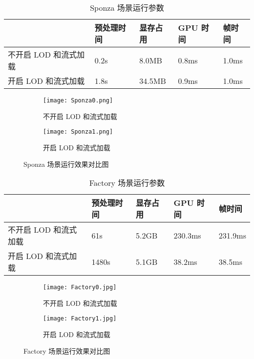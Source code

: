 \begin{table}[H]
    \caption{\label{tab:Sponza data}Sponza 场景运行参数}
    \begin{tabularx}{\linewidth}{|X<{\centering}|X<{\centering}|X<{\centering}|X<{\centering}|X<{\centering}|}
        \hline
        ~ & 预处理时间 & 显存占用 & GPU 时间 & 帧时间 \\ \hline
        不开启 LOD 和流式加载 & 0.2s & 8.0MB & 0.8ms & 1.0ms \\ \hline
        开启 LOD 和流式加载 & 1.8s & 34.5MB & 0.9ms & 1.0ms \\ \hline
    \end{tabularx}
\end{table}

\begin{figure*}[htbp]
    \centering
    \begin{subfigure}[b]{0.48\linewidth}
        \centering
        \texttt{[image: Sponza0.png]}
        \caption{不开启 LOD 和流式加载}
    \end{subfigure}%
    \hfill %
    \begin{subfigure}[b]{0.48\linewidth}
        \centering
        \texttt{[image: Sponza1.png]}
        \caption{开启 LOD 和流式加载}
    \end{subfigure}%
    \caption{Sponza 场景运行效果对比图}
    \vspace{-0.2cm}
    \label{fig:Sponza fig}
\end{figure*}

\begin{table}[H]
    \caption{\label{tab:Factory data}Factory 场景运行参数}
    \begin{tabularx}{\linewidth}{|X<{\centering}|X<{\centering}|X<{\centering}|X<{\centering}|X<{\centering}|}
        \hline
        ~ & 预处理时间 & 显存占用 & GPU 时间 & 帧时间 \\ \hline
        不开启 LOD 和流式加载 & 61s & 5.2GB & 230.3ms & 231.9ms \\ \hline
        开启 LOD 和流式加载 & 1480s & 5.1GB & 38.2ms & 38.5ms \\ \hline
    \end{tabularx}
\end{table}

\begin{figure*}[htbp]
    \centering
    \begin{subfigure}[b]{0.48\linewidth}
        \centering
        \texttt{[image: Factory0.jpg]}
        \caption{不开启 LOD 和流式加载}
    \end{subfigure}%
    \hfill %
    \begin{subfigure}[b]{0.48\linewidth}
        \centering
        \texttt{[image: Factory1.jpg]}
        \caption{开启 LOD 和流式加载}
    \end{subfigure}%
    \caption{Factory 场景运行效果对比图}
    \vspace{-0.2cm}
    \label{fig:Factory fig}
\end{figure*}

